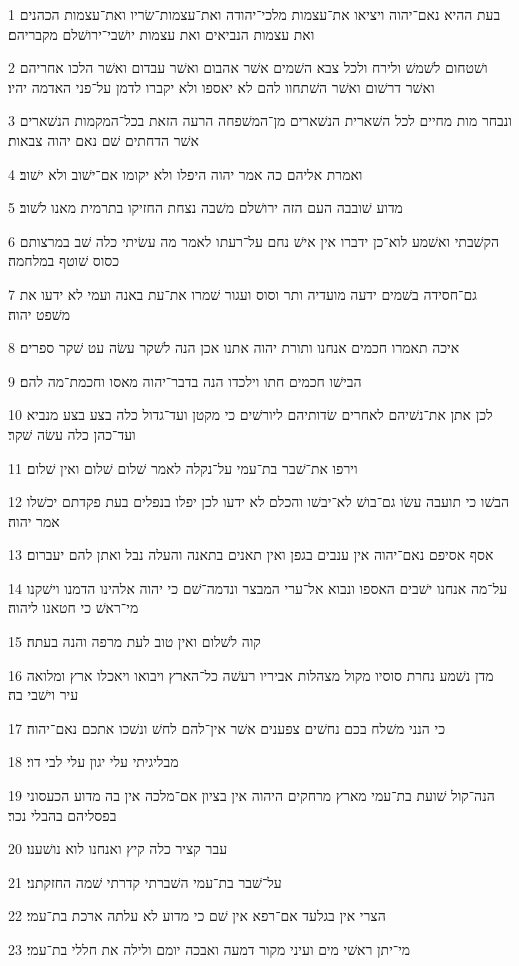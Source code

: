 \par 1 בעת ההיא נאם־יהוה ויציאו את־עצמות מלכי־יהודה ואת־עצמות־שׂריו ואת־עצמות הכהנים ואת עצמות הנביאים ואת עצמות יושׁבי־ירושׁלם מקבריהם׃
\par 2 ושׁטחום לשׁמשׁ ולירח ולכל צבא השׁמים אשׁר אהבום ואשׁר עבדום ואשׁר הלכו אחריהם ואשׁר דרשׁום ואשׁר השׁתחוו להם לא יאספו ולא יקברו לדמן על־פני האדמה יהיו׃
\par 3 ונבחר מות מחיים לכל השׁארית הנשׁארים מן־המשׁפחה הרעה הזאת בכל־המקמות הנשׁארים אשׁר הדחתים שׁם נאם יהוה צבאות׃
\par 4 ואמרת אליהם כה אמר יהוה היפלו ולא יקומו אם־ישׁוב ולא ישׁוב׃
\par 5 מדוע שׁובבה העם הזה ירושׁלם משׁבה נצחת החזיקו בתרמית מאנו לשׁוב׃
\par 6 הקשׁבתי ואשׁמע לוא־כן ידברו אין אישׁ נחם על־רעתו לאמר מה עשׂיתי כלה שׁב במרצותם כסוס שׁוטף במלחמה׃
\par 7 גם־חסידה בשׁמים ידעה מועדיה ותר וסוס ועגור שׁמרו את־עת באנה ועמי לא ידעו את משׁפט יהוה׃
\par 8 איכה תאמרו חכמים אנחנו ותורת יהוה אתנו אכן הנה לשׁקר עשׂה עט שׁקר ספרים׃
\par 9 הבישׁו חכמים חתו וילכדו הנה בדבר־יהוה מאסו וחכמת־מה להם׃
\par 10 לכן אתן את־נשׁיהם לאחרים שׂדותיהם ליורשׁים כי מקטן ועד־גדול כלה בצע בצע מנביא ועד־כהן כלה עשׂה שׁקר׃
\par 11 וירפו את־שׁבר בת־עמי על־נקלה לאמר שׁלום שׁלום ואין שׁלום׃
\par 12 הבשׁו כי תועבה עשׂו גם־בושׁ לא־יבשׁו והכלם לא ידעו לכן יפלו בנפלים בעת פקדתם יכשׁלו אמר יהוה׃
\par 13 אסף אסיפם נאם־יהוה אין ענבים בגפן ואין תאנים בתאנה והעלה נבל ואתן להם יעברום׃
\par 14 על־מה אנחנו ישׁבים האספו ונבוא אל־ערי המבצר ונדמה־שׁם כי יהוה אלהינו הדמנו וישׁקנו מי־ראשׁ כי חטאנו ליהוה׃
\par 15 קוה לשׁלום ואין טוב לעת מרפה והנה בעתה׃
\par 16 מדן נשׁמע נחרת סוסיו מקול מצהלות אביריו רעשׁה כל־הארץ ויבואו ויאכלו ארץ ומלואה עיר וישׁבי בה׃
\par 17 כי הנני משׁלח בכם נחשׁים צפענים אשׁר אין־להם לחשׁ ונשׁכו אתכם נאם־יהוה׃
\par 18 מבליגיתי עלי יגון עלי לבי דוי׃
\par 19 הנה־קול שׁועת בת־עמי מארץ מרחקים היהוה אין בציון אם־מלכה אין בה מדוע הכעסוני בפסליהם בהבלי נכר׃
\par 20 עבר קציר כלה קיץ ואנחנו לוא נושׁענו׃
\par 21 על־שׁבר בת־עמי השׁברתי קדרתי שׁמה החזקתני׃
\par 22 הצרי אין בגלעד אם־רפא אין שׁם כי מדוע לא עלתה ארכת בת־עמי׃
\par 23 מי־יתן ראשׁי מים ועיני מקור דמעה ואבכה יומם ולילה את חללי בת־עמי׃

